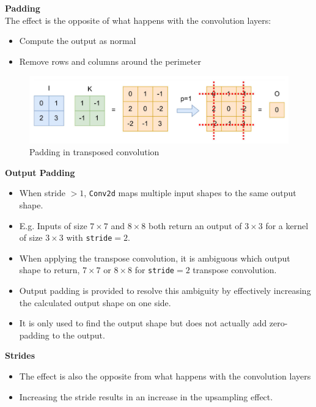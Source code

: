 \newpage

\textbf{Padding} \\
\indent The effect is the opposite of what happens with the convolution layers:
\begin{itemize}
    \item Compute the output as normal
    \item Remove rows and columns around the perimeter
\end{itemize}

\begin{figure}[h!t]
    \centering
    \includegraphics[width=0.75\linewidth]{paddingtconv.png}
    \caption{Padding in transposed convolution}
    \label{fig:enter-label}
\end{figure}

\textbf{Output Padding}

\begin{itemize}
    \item When stride $> 1$, \texttt{Conv2d} maps multiple input shapes to the same output shape.
    \item E.g. Inputs of size $7 \times 7$ and $8 \times 8$ both return an output of $3 \times 3$ for a kernel of size $3 \times 3$ with \texttt{stride}$=2$.
    \item When applying the transpose convolution, it is ambiguous which output shape to return, $7 \times 7$ or $8 \times 8$ for \texttt{stride}$=2$ transpose convolution.
    \item Output padding is provided to resolve this ambiguity by effectively increasing the calculated output shape on one side.
    \item It is only used to find the output shape but does not actually add zero-padding to the output.
\end{itemize}

\textbf{Strides}
\begin{itemize}
    \item The effect is also the opposite from what happens with the convolution layers
    \item Increasing the stride results in an increase in the upsampling effect.
\end{itemize}

